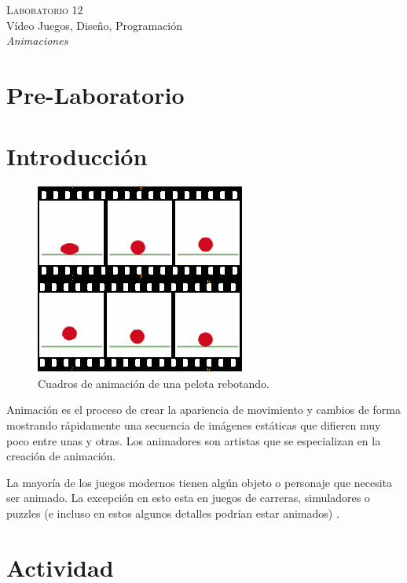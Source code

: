 \begin{center}
\textsc{\Large Laboratorio 12}~\\
{\large Vídeo Juegos, Diseño, Programación}~\\
\emph{Animaciones}
\end{center}

\section{Pre-Laboratorio}

\section{Introducción}
\setlength\intextsep{0pt}
\begin{figure}
\includegraphics[width=\linewidth]{semana12/anim_frames.png}
\caption{Cuadros de animación de una pelota rebotando.}
\label{fig:particles}
\end{figure}
Animación es el proceso de crear la apariencia de movimiento y cambios de forma mostrando rápidamente una secuencia de imágenes estáticas que difieren muy poco entre unas y otras. Los animadores son artistas que se especializan en la creación de animación.

La mayoría de los juegos modernos tienen algún objeto o personaje que necesita ser animado. La excepción en esto esta en juegos de carreras, simuladores o puzzles (e incluso en estos algunos detalles podrían estar animados) \cite[p.~381]{erikgamedevelopment}.
\section{Actividad}
